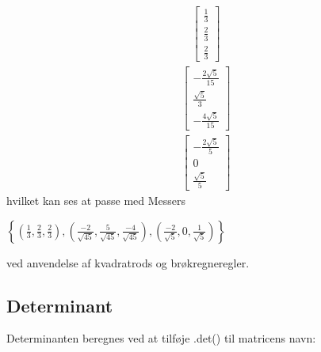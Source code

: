 \documentclass[letterpaper,10pt,english]{jupyterBook}
\begin{document}
\begin{equation*}
\begin{split}\displaystyle \left[\begin{matrix}\frac{1}{3}\\\frac{2}{3}\\\frac{2}{3}\end{matrix}\right]\end{split}
\end{equation*}\begin{equation*}
\begin{split}\displaystyle \left[\begin{matrix}- \frac{2 \sqrt{5}}{15}\\\frac{\sqrt{5}}{3}\\- \frac{4 \sqrt{5}}{15}\end{matrix}\right]\end{split}
\end{equation*}\begin{equation*}
\begin{split}\displaystyle \left[\begin{matrix}- \frac{2 \sqrt{5}}{5}\\0\\\frac{\sqrt{5}}{5}\end{matrix}\right]\end{split}
\end{equation*}
hvilket kan ses at passe med Messers

\(\left\{ \left(\frac{1}{3}, \frac{2}{3}, \frac{2}{3}\right), \left(\frac{-2}{\sqrt{45}}, \frac{5}{\sqrt{45}}, \frac{-4}{\sqrt{45}}\right),\left(\frac{-2}{\sqrt{5}}, 0, \frac{1}{\sqrt{5}}\right)\right\}\)

ved anvendelse af kvadratrods\sphinxhyphen{} og brøkregneregler.


\subsection{Determinant}
\label{\detokenize{notebooks/sympy/Notebook_LinAlg_2:determinant}}
Determinanten beregnes ved at tilføje .det() til matricens navn:
\end{document}
